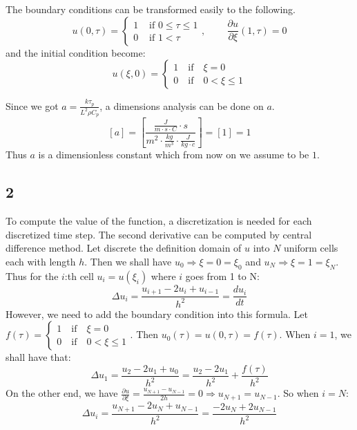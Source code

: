 \documentclass[11pt,a4paper,roman]{scrartcl}
\begin{document}
The boundary conditions can be transformed easily to the following. 
\begin{equation}
u(0,\tau) = \begin{cases} 
1 & \textrm{ if } 0\leq \tau \leq 1 \\
0 & \textrm{ if } 1 < \tau 
\end{cases} 
\textrm{, }\qquad \frac{\partial u}{\partial \xi}(1,\tau) = 0
\end{equation}
and the initial condition become:
\begin{equation}
u\left(\xi,0\right) = \begin{cases}
1 \quad \textrm{if} \quad \xi = 0 \\
0 \quad \textrm{if} \quad 0 < \xi \leq 1 \end{cases}
\end{equation}

Since we got $a = \frac{k\tau_p}{L^2 \rho C_p}$, a dimensions analysis can be done on $a$. 
\[
[a] = \left[\frac{\frac{J}{m\cdot s\cdot C}\cdot s}{m^2\cdot \frac{kg}{m^3}\cdot \frac{J}{kg\cdot c}}\right] = [1] = 1
\]
Thus $a$ is a dimensionless constant which from now on we assume to be $1$.

\subsection*{2}
To compute the value of the function, a discretization is needed for each discretized time step. The second derivative can be computed by central difference method. Let discrete the definition domain of $u$ into $N$ uniform cells each with length $h$. Then we shall have $u_0 \Rightarrow \xi = 0 = \xi_0$ and $u_N \Rightarrow \xi = 1 = \xi_N$. Thus for the $i$:th cell $u_i = u(\xi_i)$ where $i$ goes from 1 to N: 
\[
\Delta u_i = \frac{u_{i+1}-2u_i+u_{i-1}}{h^2} = \frac{d u_i}{d t}
\]
However, we need to add the boundary condition into this formula. Let $f(\tau)=\begin{cases}
1 \quad \textrm{if} \quad \xi = 0 \\
0 \quad \textrm{if} \quad 0 < \xi \leq 1 \end{cases}$. Then $u_0(\tau) = u(0,\tau) = f(\tau)$. When $i=1$, we shall have that:
\[
\Delta u_1 = \frac{u_{2}-2u_1+u_{0}}{h^2} = \frac{u_{2}-2u_1}{h^2} + \frac{f(\tau)}{h^2}
\]
On the other end, we have $\frac{\partial u}{\partial \xi} = \frac{u_{N+1}-u_{N-1}}{2h} = 0 \Rightarrow u_{N+1} = u_{N-1}$. So when $i=N$: 
\[
\Delta u_i = \frac{u_{N+1}-2u_N+u_{N-1}}{h^2} =  \frac{-2u_N+2u_{N-1}}{h^2} 
\]
\end{document}
